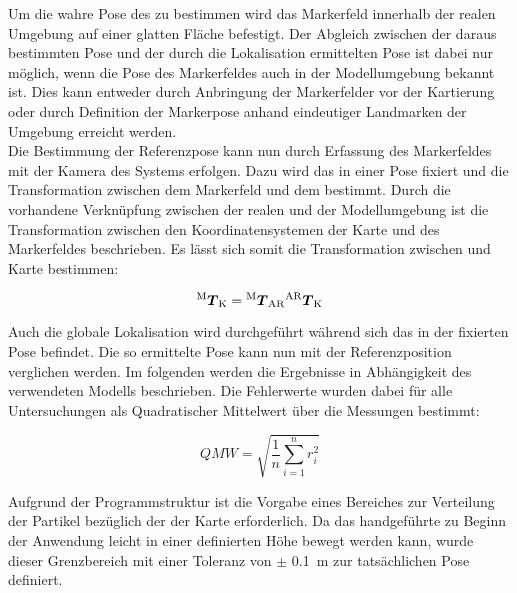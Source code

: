 Um die wahre Pose des  zu bestimmen wird das Markerfeld innerhalb der realen Umgebung auf einer glatten Fläche befestigt. Der Abgleich zwischen der daraus bestimmten Pose und der durch die Lokalisation ermittelten Pose ist dabei nur möglich, wenn die Pose des Markerfeldes auch in der Modellumgebung bekannt ist. Dies kann entweder durch Anbringung der Markerfelder vor der Kartierung oder durch Definition der Markerpose anhand eindeutiger Landmarken der Umgebung erreicht werden.\\

Die Bestimmung der Referenzpose kann nun durch Erfassung des Markerfeldes mit der Kamera des Systems erfolgen. Dazu wird das \kps{} in einer Pose fixiert und die Transformation zwischen dem Markerfeld und dem \kps{} bestimmt. Durch die vorhandene Verknüpfung zwischen der realen und der Modellumgebung ist die Transformation zwischen den Koordinatensystemen der Karte und des Markerfeldes beschrieben\red[ Bild?]. Es lässt sich somit die Transformation zwischen \kps{} und Karte bestimmen:

\begin{equation}
{^{\mathrm{M}}\mbox{\boldmath{$T$}}_{\mathrm{K}}} = {^{\mathrm{M}}\mbox{\boldmath{$T$}}_{\mathrm{AR}}}{^{\mathrm{AR}}\mbox{\boldmath{$T$}}_{\mathrm{K}}}
\end{equation}

Auch die globale Lokalisation wird durchgeführt während sich das \kps{} in der fixierten Pose befindet. Die so ermittelte Pose kann nun mit der Referenzposition verglichen werden. Im folgenden werden die Ergebnisse in Abhängigkeit des verwendeten Modells beschrieben. Die Fehlerwerte wurden dabei für alle Untersuchungen als Quadratischer Mittelwert über die Messungen bestimmt:

\begin{equation}
QMW = \sqrt{\frac{1}{n}\sum_{i=1}^nr_i^2}
\end{equation}

Aufgrund der Programmstruktur ist die Vorgabe eines Bereiches zur Verteilung der Partikel bezüglich der \red[z-Koordinate] der Karte erforderlich. Da das handgeführte \kps{} zu Beginn der Anwendung leicht in einer definierten Höhe bewegt werden kann, wurde dieser Grenzbereich mit einer Toleranz von $\pm$ \SI{0,1}{\meter} zur tatsächlichen Pose definiert.\\

